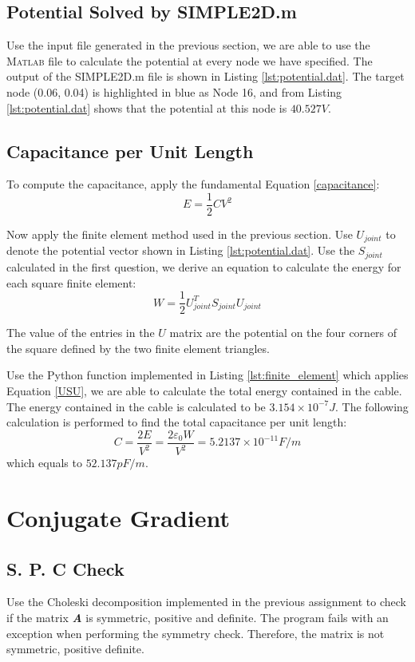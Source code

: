 \documentclass[a4paper,titlepage]{article}
\newcommand{\MATLAB}{\textsc{Matlab}\xspace}
\begin{document}
		\subsection{Potential Solved by SIMPLE2D.m}
			Use the input file generated in the previous section, we are able to use the \MATLAB file to calculate the potential at every node we have specified. The output of the SIMPLE2D.m file is shown in Listing \ref{lst:potential.dat}. The target node (0.06, 0.04) is highlighted in blue as Node 16, and from Listing \ref{lst:potential.dat} shows that the potential at this node is $40.527V$.
			
		\subsection{Capacitance per Unit Length}
			To compute the capacitance, apply the fundamental Equation \ref{capacitance}: 
			\begin{equation}
				E = \frac{1}{2} CV^2
				\label{capacitance}
			\end{equation}
			
			Now apply the finite element method used in the previous section. Use $U_{joint}$ to denote the potential vector shown in Listing \ref{lst:potential.dat}. Use the $S_{joint}$ calculated in the first question, we derive an equation to calculate the energy for each square finite element:
			\begin{equation}
				W = \frac{1}{2}U^T_{joint}S_{joint}U_{joint}
				\label{USU}
			\end{equation}
			
			The value of the entries in the $U$ matrix are the potential on the four corners of the square defined by the two finite element triangles.
			
			Use the Python function implemented in Listing \ref{lst:finite_element} which applies Equation \ref{USU}, we are able to calculate the total energy contained in the cable. The energy contained in the cable is calculated to be $3.154\times 10^{-7}J$. The following calculation is performed to find the total capacitance per unit length:
			$$
				C = \frac{2E}{V^2} = \frac{2\varepsilon_0 W}{V^2} = 5.2137\times 10^{-11}F/m
			$$
			which equals to $52.137pF/m$.
			
		\section{Conjugate Gradient}
			\subsection{S. P. C Check}
				Use the Choleski decomposition implemented in the previous assignment to check if the matrix \textbf{\textit{A}} is symmetric, positive and definite. The program fails with an exception when performing the symmetry check. Therefore, the matrix is not symmetric, positive definite. 
				
\end{document}
